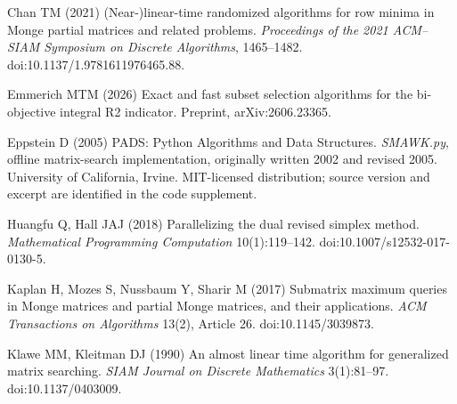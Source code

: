 Chan TM (2021) (Near-)linear-time randomized algorithms for row minima in Monge partial matrices and related problems. \emph{Proceedings of the 2021 ACM--SIAM Symposium on Discrete Algorithms}, 1465--1482. doi:10.1137/1.9781611976465.88.

Emmerich MTM (2026) Exact and fast subset selection algorithms for the bi-objective integral R2 indicator. Preprint, arXiv:2606.23365.

Eppstein D (2005) PADS: Python Algorithms and Data Structures. \emph{SMAWK.py}, offline matrix-search implementation, originally written 2002 and revised 2005. University of California, Irvine. MIT-licensed distribution; source version and excerpt are identified in the code supplement.

Huangfu Q, Hall JAJ (2018) Parallelizing the dual revised simplex method. \emph{Mathematical Programming Computation} 10(1):119--142. doi:10.1007/s12532-017-0130-5.

Kaplan H, Mozes S, Nussbaum Y, Sharir M (2017) Submatrix maximum queries in Monge matrices and partial Monge matrices, and their applications. \emph{ACM Transactions on Algorithms} 13(2), Article 26. doi:10.1145/3039873.

Klawe MM, Kleitman DJ (1990) An almost linear time algorithm for generalized matrix searching. \emph{SIAM Journal on Discrete Mathematics} 3(1):81--97. doi:10.1137/0403009.
